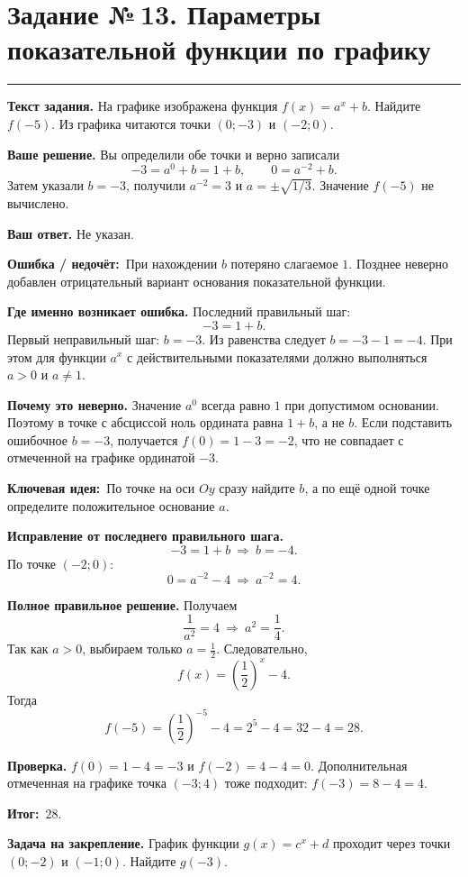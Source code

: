 \documentclass[a4paper,11pt]{article}
\newcommand{\rlabel}[1]{\par\noindent\textbf{\color{darkaccent}#1}\quad}
\newcommand{\errorlabel}{\textcolor{err}{\textbf{Ошибка / недочёт:}}}
\newcommand{\keylabel}{\textcolor{blue!60!black}{\textbf{Ключевая идея:}}}
\newcommand{\finallabel}{\textcolor{teal!60!black}{\textbf{Итог:}}}
\newcommand{\tasktitle}[2]{\clearpage\phantomsection\label{task:#1}\section*{Задание №\,#1. #2}\vspace{-3mm}\textcolor{accent}{\rule{\linewidth}{0.45pt}}}
\begin{document}
\tasktitle{13}{Параметры показательной функции по графику}
\rlabel{Текст задания.} На графике изображена функция $f(x)=a^x+b$. Найдите $f(-5)$. Из графика читаются точки $(0;-3)$ и $(-2;0)$.
\rlabel{Ваше решение.} Вы определили обе точки и верно записали
\[
-3=a^0+b=1+b,
\qquad 0=a^{-2}+b.
\]
Затем указали $b=-3$, получили $a^{-2}=3$ и $a=\pm\sqrt{1/3}$. Значение $f(-5)$ не вычислено.
\rlabel{Ваш ответ.} Не указан.
\par\noindent\errorlabel\ При нахождении $b$ потеряно слагаемое $1$. Позднее неверно добавлен отрицательный вариант основания показательной функции.
\rlabel{Где именно возникает ошибка.} Последний правильный шаг:
\[
-3=1+b.
\]
Первый неправильный шаг: $b=-3$. Из равенства следует $b=-3-1=-4$. При этом для функции $a^x$ с действительными показателями должно выполняться $a>0$ и $a\ne1$.
\rlabel{Почему это неверно.} Значение $a^0$ всегда равно $1$ при допустимом основании. Поэтому в точке с абсциссой ноль ордината равна $1+b$, а не $b$. Если подставить ошибочное $b=-3$, получается $f(0)=1-3=-2$, что не совпадает с отмеченной на графике ординатой $-3$.
\par\noindent\keylabel\ По точке на оси $Oy$ сразу найдите $b$, а по ещё одной точке определите положительное основание $a$.
\rlabel{Исправление от последнего правильного шага.}
\[
-3=1+b\ \Longrightarrow\ b=-4.
\]
По точке $(-2;0)$:
\[
0=a^{-2}-4\ \Longrightarrow\ a^{-2}=4.
\]
\rlabel{Полное правильное решение.} Получаем
\[
\frac1{a^2}=4\ \Longrightarrow\ a^2=\frac14.
\]
Так как $a>0$, выбираем только $a=\frac12$. Следовательно,
\[
f(x)=\left(\frac12\right)^x-4.
\]
Тогда
\[
f(-5)=\left(\frac12\right)^{-5}-4=2^5-4=32-4=28.
\]
\rlabel{Проверка.} $f(0)=1-4=-3$ и $f(-2)=4-4=0$. Дополнительная отмеченная на графике точка $(-3;4)$ тоже подходит: $f(-3)=8-4=4$.
\par\noindent\finallabel\ $\boxed{28}$.
\rlabel{Задача на закрепление.} График функции $g(x)=c^x+d$ проходит через точки $(0;-2)$ и $(-1;0)$. Найдите $g(-3)$.
\end{document}
